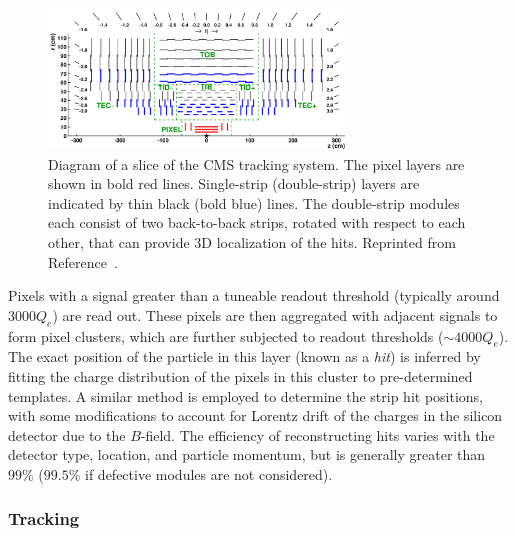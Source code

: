 \begin{figure}[]
    \begin{center} 
        \includegraphics[width=0.7\textwidth]{figures/cms/tracker.png}
        \caption{Diagram of a slice of the CMS tracking system.
                 The pixel layers are shown in bold red lines.
                 Single-strip (double-strip) layers are indicated by thin black (bold blue) lines.
                 The double-strip modules each consist of two back-to-back strips, rotated with respect to each other, that can provide 3D localization of the hits.
                 Reprinted from Reference~\cite{cmstracker}.}
        \label{fig:cms:si}
    \end{center}
\end{figure}

Pixels with a signal greater than a tuneable readout threshold (typically around $3000 Q_e$) are read out.
These pixels are then aggregated with adjacent signals to form pixel clusters, which are further subjected to readout thresholds ($\sim 4000 Q_e$).
The exact position of the particle in this layer (known as a \emph{hit}) is inferred by fitting the charge distribution of the pixels in this cluster to pre-determined templates.
A similar method is employed to determine the strip hit positions, with some modifications to account for Lorentz drift of the charges in the silicon detector due to the $B$-field. 
The efficiency of reconstructing hits varies with the detector type, location, and particle momentum, but is generally greater than $99\%$ ($99.5\%$ if defective modules are not considered). 

\subsubsection{Tracking}

